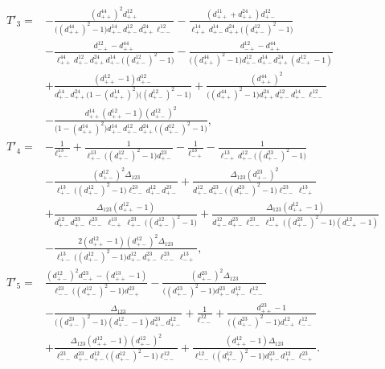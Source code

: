 \documentclass[a4,10pt]{amsart}
\numberwithin{equation}{section}
\theoremstyle{definition}
\begin{document}
\begin{align*}
T'_3={}&
-\frac{(d^{44}_{++})^2d^{12}_{++}}
{\bigl((d^{44}_{++})^2-1\bigr)d^{14}_{+-}d^{12}_{+-}
 d^{24}_{++}\ell^{12}_{--}}
-\frac{(d^{11}_{++}+d^{24}_{++})d^{12}_{+-}}
{\ell^{14}_{++}d^{14}_{+-}d^{24}_{++}
 \bigl((d^{12}_{+-})^2-1\bigr)}
\\
&-\frac{d^{12}_{-+}-d^{44}_{++}}
{\ell^{44}_{++}d^{12}_{+-}d^{24}_{++}d^{14}_{+-}
 \bigl((d^{12}_{+-})^2-1\bigr)}
-\frac{d^{12}_{-+}-d^{44}_{++}}
{\bigl((d^{44}_{++})^2-1\bigr)d^{12}_{+-}d^{14}_{+-}
 d^{24}_{++}(d^{12}_{-+}-1)}
\\
&+\frac{(d^{12}_{++}-1)d^{12}_{+-}}
{d^{14}_{+-}d^{24}_{++}\bigl(1-(d^{14}_{++})^2\bigr)
 \bigl((d^{12}_{+-})^2-1\bigr)}
+\frac{(d^{44}_{++})^2}
{\bigl((d^{44}_{++})^2-1\bigr)d^{24}_{++}d^{12}_{+-}
 d^{14}_{+-}\ell^{12}_{--}}\\
&-\frac{d^{14}_{++}(d^{12}_{++}-1)(d^{12}_{+-})^2}
{\bigl(1-(d^{14}_{++})^2\bigr)d^{14}_{+-}d^{12}_{+-}d^{24}_{++}
 \bigl((d^{12}_{+-})^2-1\bigr)},\\[2mm]
T'_4={}&
-\frac{1}{\ell^{13}_{+-}}
+\frac{1}{\ell^{13}_{+-}\bigl((d^{12}_{+-})^2-1\bigr)d^{23}_{+-}}
-\frac{1}{\ell^{13}_{-+}}
-\frac{1}{\ell^{13}_{-+}d^{12}_{+-}\bigl((d^{23}_{+-})^2-1\bigr)}\\
&-\frac{(d^{12}_{+-})^2\Delta_{123}}
{\ell^{13}_{+-}\bigl((d^{12}_{+-})^2-1\bigr)
 \ell^{23}_{--}d^{12}_{+-}d^{23}_{+-}}
+\frac{\Delta_{123}(d^{23}_{+-})^2}
{d^{12}_{+-}d^{23}_{+-}\bigl((d^{23}_{+-})^2-1\bigr)
 \ell^{23}_{--}\ell^{13}_{-+}}\\
&+\frac{\Delta_{123}(d^{12}_{++}-1)}
{d^{12}_{+-}d^{23}_{+-}\ell^{23}_{--}\ell^{13}_{-+}
 \ell^{23}_{+-}\bigl((d^{12}_{+-})^2-1\bigr)}
+\frac{\Delta_{123}(d^{12}_{++}-1)}
{d^{12}_{+-}d^{23}_{+-}\ell^{23}_{--}\ell^{13}_{-+}
 \bigl((d^{23}_{+-})^2-1\bigr)(d^{12}_{-+}-1)}
\\
&-\frac{2(d^{12}_{++}-1)(d^{12}_{+-})^2\Delta_{123}}
{\ell^{13}_{+-}\bigl((d^{12}_{+-})^2-1\bigr)d^{12}_{+-}d^{23}_{+-}
 \ell^{23}_{--}\ell^{13}_{-+}},\\[2mm]
T'_5={}&
\frac{(d^{12}_{+-})^2d^{23}_{-+}-(d^{13}_{++}-1)}
{\ell^{23}_{--}\bigl((d^{12}_{+-})^2-1\bigr)d^{23}_{-+}}
-\frac{(d^{23}_{+-})^2\Delta_{123}}
{\bigl((d^{23}_{+-})^2-1\bigr)d^{23}_{+-}d^{12}_{+-}\ell^{12}_{--}}\\
&-\frac{\Delta_{123}}
{\bigl((d^{23}_{+-})^2-1\bigr)(d^{12}_{+-}-1)
 d^{23}_{+-}d^{12}_{+-}}
+\frac{1}{\ell^{12}_{--}}
+\frac{d^{23}_{++}-1}
{\bigl((d^{23}_{+-})^2-1\bigr)d^{12}_{-+}\ell^{12}_{--}}
\\
&+\frac{\Delta_{123}(d^{12}_{++}-1)(d^{12}_{+-})^2}
{\ell^{23}_{--}d^{23}_{+-}d^{12}_{+-}
 \bigl((d^{12}_{+-})^2-1\bigr)\ell^{12}_{--}}
+\frac{(d^{12}_{++}-1)\Delta_{123}}
{\ell^{12}_{--}\bigl((d^{12}_{+-})^2-1\bigr)
 d^{23}_{+-}d^{12}_{+-}\ell^{23}_{-+}}.
\end{align*}
\end{document}
